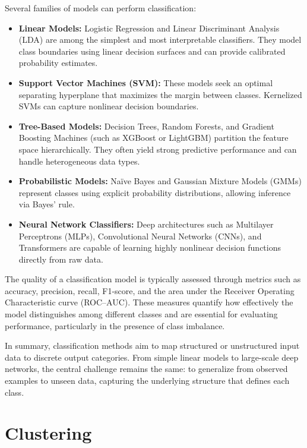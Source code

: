 \documentclass[12pt,a4paper]{report}
\begin{document}
\vspace{0.5em}
Several families of models can perform classification:
\begin{itemize}
    \item \textbf{Linear Models:} Logistic Regression and Linear Discriminant Analysis (LDA) 
    are among the simplest and most interpretable classifiers. They model class boundaries 
    using linear decision surfaces and can provide calibrated probability estimates.
    \item \textbf{Support Vector Machines (SVM):} These models seek an optimal separating 
    hyperplane that maximizes the margin between classes. Kernelized SVMs can capture 
    nonlinear decision boundaries.
    \item \textbf{Tree-Based Models:} Decision Trees, Random Forests, and Gradient Boosting 
    Machines (such as XGBoost or LightGBM) partition the feature space hierarchically. 
    They often yield strong predictive performance and can handle heterogeneous data types.
    \item \textbf{Probabilistic Models:} Naïve Bayes and Gaussian Mixture Models (GMMs) 
    represent classes using explicit probability distributions, allowing inference via Bayes’ rule.
    \item \textbf{Neural Network Classifiers:} Deep architectures such as Multilayer Perceptrons (MLPs), 
    Convolutional Neural Networks (CNNs), and Transformers are capable of learning highly 
    nonlinear decision functions directly from raw data.
\end{itemize}

\vspace{0.5em}
The quality of a classification model is typically assessed through metrics such as 
accuracy, precision, recall, F1-score, and the area under the Receiver Operating Characteristic 
curve (ROC–AUC). These measures quantify how effectively the model distinguishes among 
different classes and are essential for evaluating performance, particularly in the presence 
of class imbalance.

\vspace{0.5em}
In summary, classification methods aim to map structured or unstructured input data 
to discrete output categories. From simple linear models to large-scale deep networks, 
the central challenge remains the same: to generalize from observed examples to unseen data, 
capturing the underlying structure that defines each class.


\section{Clustering}
\end{document}
